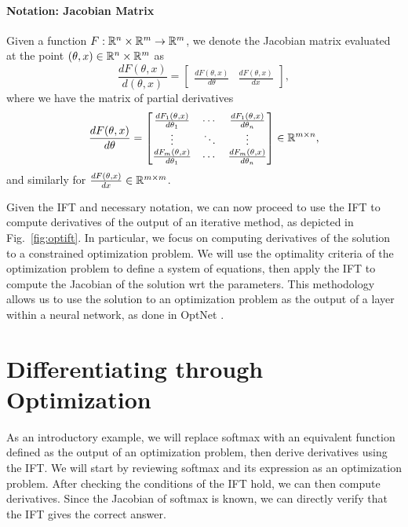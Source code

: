 \documentclass[11pt]{article}
\begin{document}
\paragraph{Notation: Jacobian Matrix}
Given a function $F:\mathbb{R}^n\times\mathbb{R}^m\to\mathbb{R}^m$, we denote the Jacobian matrix evaluated at
the point $(\theta,x)\in\mathbb{R}^n\times\mathbb{R}^m$ as
\begin{equation*}
\frac{dF(\theta,x)}{d(\theta,x)} = \begin{bmatrix}
    \frac{dF(\theta,x)}{d\theta} &\frac{dF(\theta,x)}{dx} 
\end{bmatrix},
\end{equation*}
where we have the matrix of partial derivatives
\begin{equation*}
\frac{dF(\theta,x)}{d\theta} = \begin{bmatrix}
    \frac{dF_1(\theta,x)}{d\theta_1} & \cdots & \frac{dF_1(\theta,x)}{d\theta_n} \\
    \vdots & \ddots & \vdots \\
    \frac{dF_m(\theta,x)}{d\theta_1} & \cdots & \frac{dF_m(\theta,x)}{d\theta_n} \\
\end{bmatrix}\in\mathbb{R}^{m\times n},
\end{equation*}
and similarly for $\frac{dF(\theta,x)}{dx}\in\mathbb{R}^{m\times m}$.


Given the IFT and necessary notation, we can now proceed to use the IFT
to compute derivatives of the output of an iterative method,
as depicted in Fig.~\ref{fig:optift}.
In particular, we focus on computing derivatives of the solution to a
constrained optimization problem.
We will use the optimality criteria of the optimization problem to define a system of equations,
then apply the IFT to compute the Jacobian of the solution wrt the parameters.
This methodology allows us to use the solution to an optimization problem
as the output of a layer within a neural network,
as done in OptNet \citep{optnet}.


\section{Differentiating through Optimization}
As an introductory example,
we will replace softmax with an equivalent function
defined as the output of an optimization problem, then derive derivatives using the IFT.
We will start by reviewing softmax and its expression as an optimization problem.
After checking the conditions of the IFT hold, we can then compute derivatives.
Since the Jacobian of softmax is known, we can directly verify that the IFT gives
the correct answer.
\end{document}
